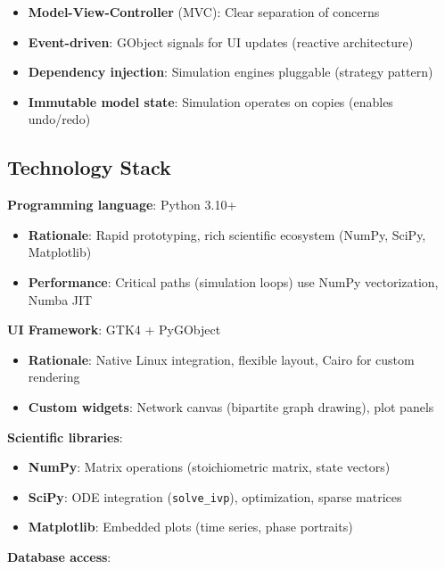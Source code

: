 \begin{itemize}
    \item \textbf{Model-View-Controller} (MVC): Clear separation of concerns
    \item \textbf{Event-driven}: GObject signals for UI updates (reactive architecture)
    \item \textbf{Dependency injection}: Simulation engines pluggable (strategy pattern)
    \item \textbf{Immutable model state}: Simulation operates on copies (enables undo/redo)
\end{itemize}

\subsection{Technology Stack}
\label{subsec:technology-stack}

\textbf{Programming language}: Python 3.10+

\begin{itemize}
    \item \textbf{Rationale}: Rapid prototyping, rich scientific ecosystem (NumPy, SciPy, Matplotlib)
    \item \textbf{Performance}: Critical paths (simulation loops) use NumPy vectorization, Numba JIT
\end{itemize}

\textbf{UI Framework}: GTK4 + PyGObject

\begin{itemize}
    \item \textbf{Rationale}: Native Linux integration, flexible layout, Cairo for custom rendering
    \item \textbf{Custom widgets}: Network canvas (bipartite graph drawing), plot panels
\end{itemize}

\textbf{Scientific libraries}:

\begin{itemize}
    \item \textbf{NumPy}: Matrix operations (stoichiometric matrix, state vectors)
    \item \textbf{SciPy}: ODE integration (\texttt{solve\_ivp}), optimization, sparse matrices
    \item \textbf{Matplotlib}: Embedded plots (time series, phase portraits)
\end{itemize}

\textbf{Database access}:

